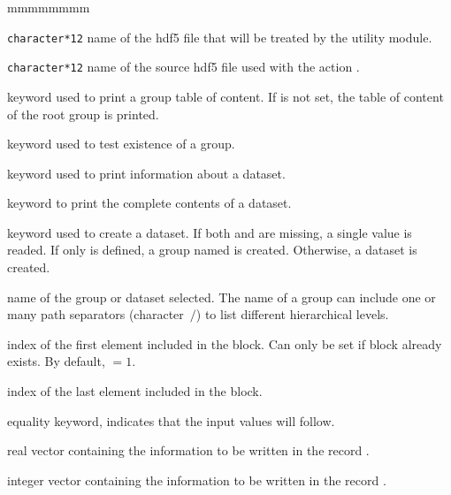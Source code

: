 \begin{ListeDeDescription}{mmmmmmmm}

\item[\dusa{NAME1}] {\tt character*12} name of the {\sc hdf5} file that will be treated by the utility module.

\item[\dusa{NAME2}] {\tt character*12} name of the source {\sc hdf5} file used with the action .

\item[\moc{DIR}] keyword used to print a group table of content. If  is not set, the table of content of the root group is printed.

\item[\moc{TEST}] keyword used to test existence of a group.

\item[\moc{INFO}] keyword used to print information about a dataset.

\item[\moc{IMPR}] keyword to print the complete contents of a dataset.

\item[\moc{CREA}] keyword used to create a dataset. If both  and  are missing, a single value is readed. If
only   is defined, a group named  is created. Otherwise, a dataset is created.

\item[\dusa{BLOCK}] name of the group or dataset selected. The name of a group can include one or many path separators (character~$\slash$)
to list different hierarchical levels.

\item[\dusa{ilenc1}] index of the first element included in the block. Can only be set if block
 already exists. By default,  $=1$.

\item[\dusa{ilenc2}] index of the last element included in the block.

\item[\moc{=}] equality keyword, indicates that the input values will follow.

\item[\dusa{valc}] real vector containing the information to be written in the record .

\item[\dusa{ivalc}] integer vector containing the information to be written in the record .


\end{ListeDeDescription}
